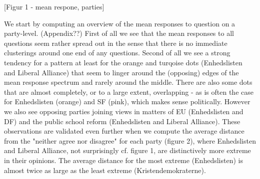 [Figur 1 - mean respone, parties]

We start by computing an overview of the mean responses to question on a party-level. (Appendix??) First of all we see that the mean responses to all questions seem rather spread out in the sense that there is no immediate clusterings around one end of any questions. Second of all we see a strong tendency for a pattern at least for the orange and turqoise dots (Enhedslisten and Liberal Alliance) that seem to linger around the (opposing) edges of the mean response spectrum and rarely around the middle. There are also some dots that are almost completely, or to a large extent, overlapping - as is often the case for Enhedslisten (orange) and SF (pink), which makes sense politically. However we also see opposing parties joining views in matters of EU (Enhedslisten and DF) and the public school reform (Enhedslisten and Liberal Alliance).
These observations are validated even further when we compute the average distance from the "neither agree nor disagree" for each party (figure 2), where Enhedslisten and Liberal Alliance, not surprisingly cf. figure 1, are distinctively more extreme in their opinions. The average distance for the most extreme (Enhedslisten) is almost twice as large as the least extreme (Kristendemokraterne). 

